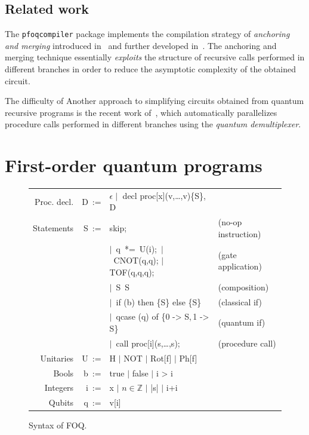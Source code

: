 \documentclass[a4paper,onecolumn,11pt,unpublished]{quantumarticle}
\newcommand{\pfoqcompiler}{\texttt{pfoqcompiler}}
\begin{document}
\subsection{Related work} The \pfoqcompiler{} package implements the compilation strategy of \emph{anchoring and merging} introduced in~\cite{HPS23} and further developed in~\cite{HPS25}. The anchoring and merging technique essentially \emph{exploits} the structure of recursive calls performed in different branches in order to reduce the asymptotic complexity of the obtained circuit.

The difficulty of 
Another approach to simplifying circuits obtained from quantum recursive programs is the recent work of~\cite{ZY25}, which automatically parallelizes procedure calls performed in different branches using the \emph{quantum demultiplexer}.

\section{First-order quantum programs}

\begin{figure}
{\ttfamily
\begin{tabular}{rrll}
     \textnormal{Proc. decl.} & D\ :=&  $\epsilon \mid$ decl proc[x](v,\dots,v)\{S\}, D  & \\
     \textnormal{Statements}  & S\ := & skip; & \textnormal{(no-op instruction)}\\
     & & $\mid$\ q\ *=\ U(i);\ $\mid$\ CNOT(q,q); $\mid$ TOF(q,q,q);& \textnormal{(gate application)}\\
     & & $\mid$\ S\ S & \textnormal{(composition)}\\
     & & $\mid$\ if (b) then \{S\} else \{S\} & \textnormal{(classical if)}\\
     & & $\mid$\ qcase (q) of \{0 -> S,\,1 -> S\} & \textnormal{(quantum if)}\\
     & & $\mid$\ call proc[i](s,\dots,s); & \textnormal{(procedure call)}\\
     \textnormal{Unitaries}  & U\ :=& H $\mid$ NOT $\mid$  Rot[f] $\mid$ Ph[f] &\\
    \textnormal{Bools}  & b\ :=& true $\mid$ false $\mid$  i > i &\\
     \textnormal{Integers}& i\ :=& x $\mid$ $n\in\mathbb{Z}$ $\mid$ |s| $\mid$ i+i\\
     \textnormal{Qubits}& q\ :=& v[i]
\end{tabular}
}
\caption{Syntax of FOQ.}
\end{figure}
\end{document}
